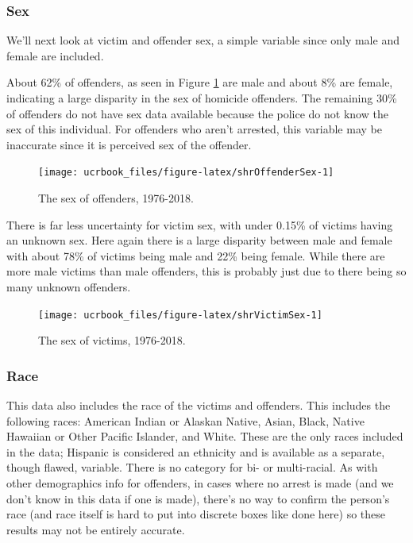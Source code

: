 \documentclass[
  12pt,
  openany]{book}
\begin{document}
\hypertarget{sex}{%
\subsubsection{Sex}\label{sex}}

We'll next look at victim and offender sex, a simple variable since only male and female are included.

About 62\% of offenders, as seen in Figure \ref{fig:shrOffenderSex} are male and about 8\% are female, indicating a large disparity in the sex of homicide offenders. The remaining 30\% of offenders do not have sex data available because the police do not know the sex of this individual. For offenders who aren't arrested, this variable may be inaccurate since it is perceived sex of the offender.

\begin{figure}

{\centering \texttt{[image: ucrbook\_files/figure-latex/shrOffenderSex-1]} 

}

\caption{The sex of offenders, 1976-2018.}\label{fig:shrOffenderSex}
\end{figure}

There is far less uncertainty for victim sex, with under 0.15\% of victims having an unknown sex. Here again there is a large disparity between male and female with about 78\% of victims being male and 22\% being female. While there are more male victims than male offenders, this is probably just due to there being so many unknown offenders.

\begin{figure}

{\centering \texttt{[image: ucrbook\_files/figure-latex/shrVictimSex-1]} 

}

\caption{The sex of victims, 1976-2018.}\label{fig:shrVictimSex}
\end{figure}

\hypertarget{race-1}{%
\subsubsection{Race}\label{race-1}}

This data also includes the race of the victims and offenders. This includes the following races: American Indian or Alaskan Native, Asian, Black, Native Hawaiian or Other Pacific Islander, and White. These are the only races included in the data; Hispanic is considered an ethnicity and is available as a separate, though flawed, variable. There is no category for bi- or multi-racial. As with other demographics info for offenders, in cases where no arrest is made (and we don't know in this data if one is made), there's no way to confirm the person's race (and race itself is hard to put into discrete boxes like done here) so these results may not be entirely accurate.
\end{document}

